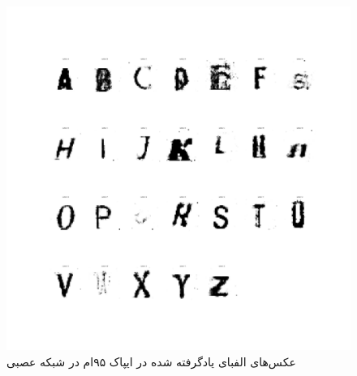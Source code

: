 \documentclass{article}
\begin{document}
\begin{figure}[H]
	\centerline{\includegraphics[width=\textwidth , height=\textheight ]{../results/CGAN_Adam/figs/Alphabet_(Epoch=95)}}
	\caption{عکس‌های الفبای یادگرفته شده در ایپاک ۹۵ام در شبکه عصبی}
\end{figure}

\end{document}
